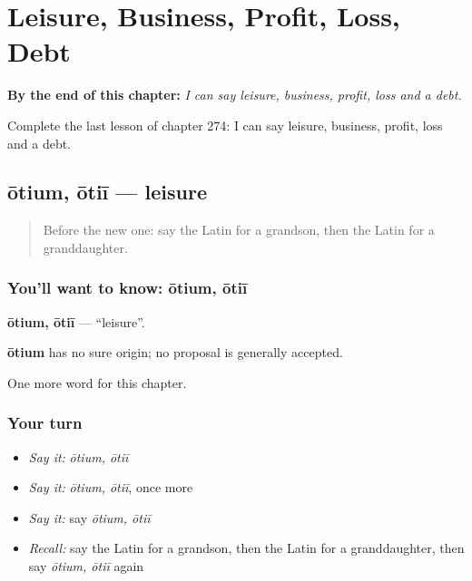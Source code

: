 
\chapter{Leisure, Business, Profit, Loss, Debt}
\label{ch:la-leisure-business-profit-loss-debt}

\begin{chapteropening}
\textbf{By the end of this chapter:} \emph{I can say leisure, business, profit, loss and a debt.}

Complete the last lesson of chapter 274: I can say leisure, business, profit, loss and a debt.
\end{chapteropening}

\section[ōtium, ōtiī]{ōtium, ōtiī — leisure}

\label{lesson:LA-C274-otium}



\begin{quote}
Before the new one: say the Latin for a grandson, then the Latin for a granddaughter.
\end{quote}

\subsection*{You'll want to know: ōtium, ōtiī}
\textbf{ōtium, ōtiī} — \textquotedblleft{}leisure\textquotedblright{}.

\begin{cousinweb}
\textbf{ōtium} has no sure origin; no proposal is generally accepted.
\end{cousinweb}

\begin{grammarlens}[title={What you've built}]
One more word for this chapter.
\end{grammarlens}

\subsection*{Your turn}
\begin{itemize}
\raggedright
  \item \emph{Say it:} \emph{ōtium, ōtiī}
  \item \emph{Say it:} \emph{ōtium, ōtiī}, once more
  \item \emph{Say it:} say \emph{ōtium, ōtiī}
  \item \emph{Recall:} say the Latin for a grandson, then the Latin for a granddaughter, then say \emph{ōtium, ōtiī} again
\end{itemize}

